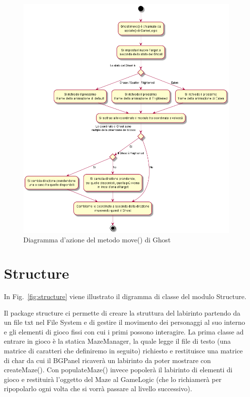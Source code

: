 \documentclass[12pt,a4paper]{report}
\begin{document}
\begin{figure}[tbp]
\begin{center}
 \centerline{ \includegraphics[width=17cm]{ghost_move}}
\end{center}
  \caption{Diagramma d'azione del metodo move() di Ghost}
  \label{fig:ghost_move}
\end{figure}

\newpage


\section{Structure}\label{se:arch.structure}
In Fig.~\ref{fig:structure} viene illustrato il digramma di classe del modulo Structure.\newline

Il package structure ci permette di creare la struttura del labirinto partendo da un file txt nel File System e di gestire il movimento dei personaggi al suo interno e gli elementi di gioco fissi con cui i primi possono interagire.
La prima classe ad entrare in gioco è la statica MazeManager, la quale legge il file di testo (una matrice di caratteri che definiremo in seguito) richiesto e restituisce una matrice di char da cui il BGPanel ricaverà un labirinto da poter mostrare con createMaze(). Con populateMaze() invece popolerà il labirinto di elementi di gioco e restituirà l’oggetto del Maze al GameLogic (che lo richiamerà per ripopolarlo ogni volta che si vorrà passare al livello successivo).
\end{document}
